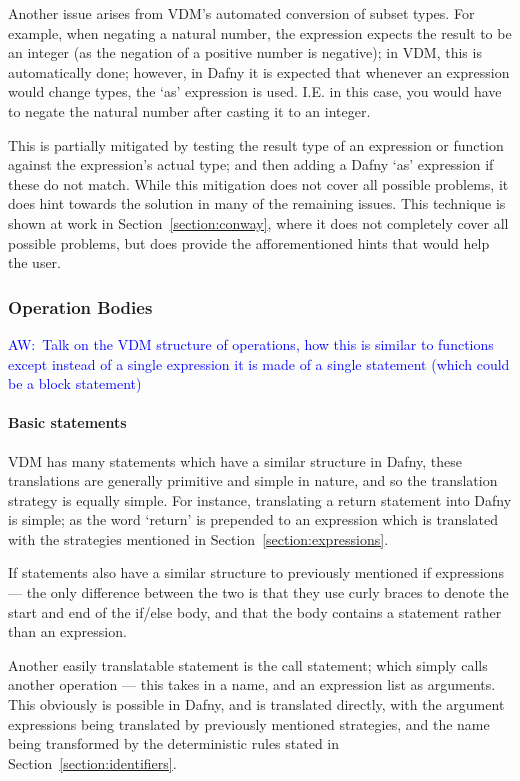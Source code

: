 \documentclass{entcs}
\newcommand{\awcomment}[1]{\ifthenelse { \boolean{showComments} } {\textcolor{blue}{AW:~#1}} { } } %
\begin{document}
Another issue arises from VDM's automated conversion of subset types. For example, when negating a natural number, the expression expects the result to be an integer (as the negation of a positive number is negative); in VDM, this is automatically done; however, in Dafny it is expected that whenever an expression would change types, the `as' expression is used. I.E. in this case, you would have to negate the natural number after casting it to an integer.

This is partially mitigated by testing the result type of an expression or function against the expression's actual type; and then adding a Dafny `as' expression if these do not match. While this mitigation does not cover all possible problems, it does hint towards the solution in many of the remaining issues. This technique is shown at work in Section~\ref{section:conway}, where it does not completely cover all possible problems, but does provide the afforementioned hints that would help the user.

\subsubsection{Operation Bodies}\label{section:statements}

\awcomment{Talk on the VDM structure of operations, how this is similar to functions except instead of a single expression it is made of a single statement (which could be a block statement)}

\paragraph{Basic statements}

VDM has many statements which have a similar structure in Dafny, these translations are generally primitive and simple in nature, and so the translation strategy is equally simple. For instance, translating a return statement into Dafny is simple; as the word `return' is prepended to an expression which is translated with the strategies mentioned in Section~\ref{section:expressions}. 

If statements also have a similar structure to previously mentioned if expressions --- the only difference between the two is that they use curly braces to denote the start and end of the if/else body, and that the body contains a statement rather than an expression. 

Another easily translatable statement is the call statement; which simply calls another operation --- this takes in a name, and an expression list as arguments. This obviously is possible in Dafny, and is translated directly, with the argument expressions being translated by previously mentioned strategies, and the name being transformed by the deterministic rules stated in Section~\ref{section:identifiers}.
\end{document}
